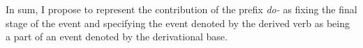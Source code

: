 In sum, I propose to represent the contribution of the prefix \textit{do-} as fixing the final stage of the event and specifying the event denoted by the derived verb as being a part of an event denoted by the derivational base.


%


